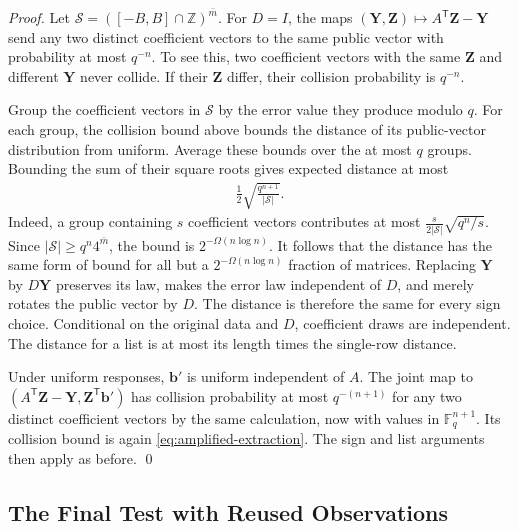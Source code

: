 \documentclass[runningheads,envcountsame,envcountsect,orivec]{llncs}
\begin{document}
\begin{proof}
Let $\mathcal S=([-B,B]\cap\mathbb Z)^{\bar m}$.
For $D=I$, the maps
$(\boldsymbol Y,\boldsymbol Z)\mapsto A^{\mathsf T}\boldsymbol Z-\boldsymbol Y$
send any two distinct coefficient vectors to the same public
vector with probability at most $q^{-n}$. To see this, two
coefficient vectors with the same $\boldsymbol Z$ and different
$\boldsymbol Y$ never collide. If their $\boldsymbol Z$ differ,
their collision probability is $q^{-n}$.

Group the coefficient vectors in $\mathcal S$ by the error
value they produce modulo $q$. For each group, the collision
bound above bounds the distance of its public-vector
distribution from uniform. Average these bounds over the
at most $q$ groups. Bounding the sum of their square roots
gives expected distance at most
\begin{align}
 \frac12\sqrt{\frac{q^{n+1}}{|\mathcal S|}}.
 \label{eq:amplified-extraction}
\end{align}
Indeed, a group containing $s$ coefficient vectors contributes at most
$\tfrac{s}{2|\mathcal S|}\sqrt{q^n/s}$.
Since $|\mathcal S|\ge q^n4^{\bar m}$, the bound is
$2^{-\Omega(n\log n)}$. It follows that the distance has the
same form of bound for all but a $2^{-\Omega(n\log n)}$
fraction of matrices.
Replacing $\boldsymbol Y$ by $D\boldsymbol Y$ preserves
its law, makes the error law independent of $D$, and merely
rotates the public vector by $D$. The distance is therefore
the same for every sign choice. Conditional on the original
data and $D$, coefficient draws are independent. The
distance for a list is at most its length times the
single-row distance.

Under uniform responses, $\boldsymbol b'$ is uniform
independent of $A$. The joint map to
$(A^{\mathsf T}\boldsymbol Z-\boldsymbol Y,
\boldsymbol Z^{\mathsf T}\boldsymbol b')$
has collision probability at most $q^{-(n+1)}$ for any two
distinct coefficient vectors by the same calculation, now
with values in $\mathbb F_q^{n+1}$. Its collision bound is again
\eqref{eq:amplified-extraction}. The sign and list arguments
then apply as before.
\qed
\end{proof}

\subsection{The Final Test with Reused Observations}
\end{document}
